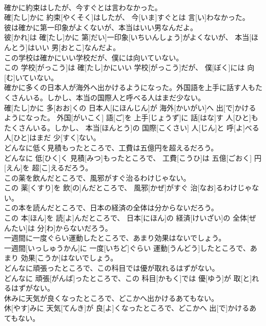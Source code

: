\documentclass[8pt]{extreport}
\begin{document}
\begin{CJK}{UTF8}{min}
\\	確かに約束はしたが、今すぐとは言わなかった。	
\\	確[たし]かに 約束[やくそく]はしたが、 今[いま]すぐとは 言[い]わなかった。
\\	彼は確かに第一印象がよくないが、本当はいい男なんだよ。	
\\	彼[かれ]は 確[たし]かに 第[だい]一印象[いちいんしょう]がよくないが、 本当[ほんとう]はいい 男[おとこ]なんだよ。
\\	この学校は確かにいい学校だが、僕には向いていない。	
\\	この 学校[がっこう]は 確[たし]かにいい 学校[がっこう]だが、 僕[ぼく]には 向[む]いていない。
\\	確かに多くの日本人が海外へ出かけるようになった。外国語を上手に話す人もたくさんいる。しかし、本当の国際人と呼べる人はまだ少ない。	
\\	確[たし]かに 多[おお]くの 日本人[にほんじん]が 海外[かいがい]へ 出[で]かけるようになった。 外国[がいこく] 語[ご]を 上手[じょうず]に 話[はな]す 人[ひと]もたくさんいる。しかし、 本当[ほんとう]の 国際[こくさい] 人[じん]と 呼[よ]べる 人[ひと]はまだ 少[すく]ない。
\\	どんなに低く見積もったところで、工費は五億円を超えるだろう。	
\\	どんなに 低[ひく]く 見積[みつ]もったところで、 工費[こうひ]は 五億[ごおく] 円[えん]を 超[こ]えるだろう。
\\	この薬を飲んだところで、風邪がすぐ治るわけじゃない。	
\\	この 薬[くすり]を 飲[の]んだところで、 風邪[かぜ]がすぐ 治[なお]るわけじゃない。
\\	この本を読んだところで、日本の経済の全体は分からないだろう。	
\\	この 本[ほん]を 読[よ]んだところで、 日本[にほん]の 経済[けいざい]の 全体[ぜんたい]は 分[わ]からないだろう。
\\	一週間に一度ぐらい運動したところで、あまり効果はないでしょう。	
\\	一週間[いっしゅうかん]に 一度[いちど]ぐらい 運動[うんどう]したところで、あまり 効果[こうか]はないでしょう。
\\	どんなに頑張ったところで、この科目では優が取れるはずがない。	
\\	どんなに 頑張[がんば]ったところで、この 科目[かもく]では 優[ゆう]が 取[と]れるはずがない。
\\	休みに天気が良くなったところで、どこかへ出かけるあてもない。	
\\	休[やす]みに 天気[てんき]が 良[よ]くなったところで、どこかへ 出[で]かけるあてもない。

\end{CJK}
\end{document}

